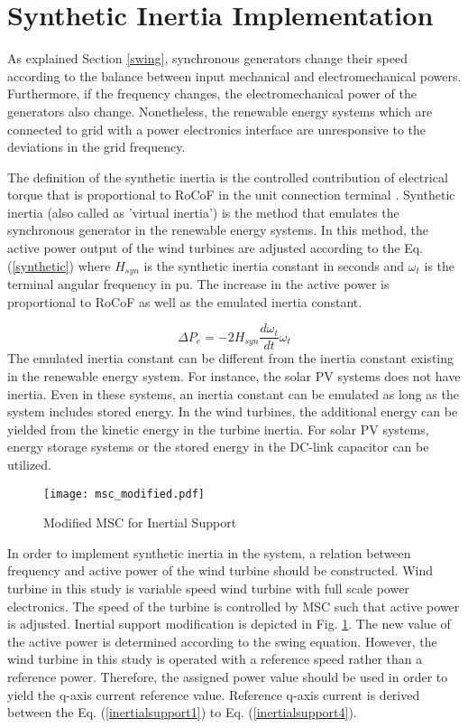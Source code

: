 \section{Synthetic Inertia Implementation}
As explained Section \ref{swing}, synchronous generators change their speed according to the balance between input mechanical and electromechanical powers. Furthermore, if the frequency changes, the electromechanical power of the generators also change. Nonetheless, the renewable energy systems which are connected to grid with a power electronics interface are unresponsive to the deviations in the grid frequency.\par
The definition of the synthetic inertia is the controlled contribution of electrical torque that is proportional to RoCoF in the unit connection terminal \cite{Eriksson2017}. Synthetic inertia (also called as 'virtual inertia') is the method that emulates the synchronous generator in the renewable energy systems. In this method, the active power output of the wind turbines are adjusted according to the Eq. (\ref{synthetic}) where $H_{syn}$ is the synthetic inertia constant in seconds and $\omega_{t}$ is the terminal angular frequency in pu. The increase in the active power is proportional to RoCoF as well as the emulated inertia constant.\par
\begin{equation}
\Delta P_{e}=-2H_{syn}\frac{d\omega_{t}}{dt}\omega_{t}
\label{synthetic}
\end{equation}
The emulated inertia constant can be different from the inertia constant existing in the renewable energy system. For instance, the solar PV systems does not have inertia. Even in these systems, an inertia constant can be emulated as long as the system includes stored energy. In the wind turbines, the additional energy can be yielded from the kinetic energy in the turbine inertia. For solar PV systems, energy storage systems or the stored energy in the DC-link capacitor can be utilized.\par
\begin{figure}[h!]
	\centering
	\texttt{[image: msc\_modified.pdf]}
	\caption{Modified MSC for Inertial Support}
	\label{modifiedmsc}
\end{figure}
In order to implement synthetic inertia in the system, a relation between frequency and active power of the wind turbine should be constructed. Wind turbine in this study is variable speed wind turbine with full scale power electronics. The speed of the turbine is controlled by MSC such that active power is adjusted. Inertial support modification is depicted in Fig. \ref{modifiedmsc}. The new value of the active power is determined according to the swing equation. However, the wind turbine in this study is operated with a reference speed rather than a reference power. Therefore, the assigned power value should be used in order to yield the q-axis current reference value. Reference q-axis current is derived between the Eq. (\ref{inertialsupport1}) to Eq. (\ref{inertialsupport4}).\par
